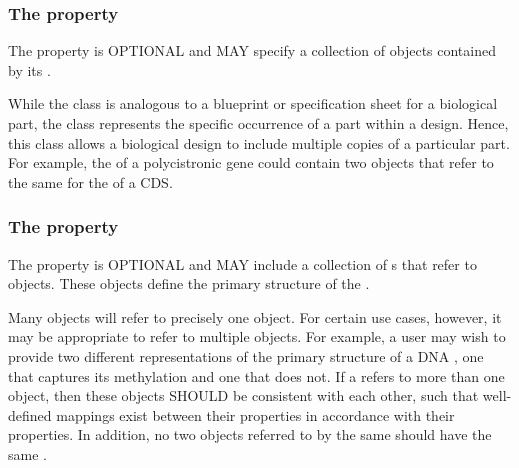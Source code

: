 \subsubsection*{The  property}
\label{sec:components}

The  property is OPTIONAL and MAY specify a collection of  objects contained by its .

While the  class is analogous to a blueprint or specification sheet for a biological part, the  class represents the specific occurrence of a part within a design. Hence, this class allows a biological design to include multiple copies of a particular part. For example, the  of a polycistronic gene could contain two  objects that refer to the same  for the  of a CDS.

\subsubsection*{The  property}
\label{sec:sequences}
The  property is OPTIONAL and MAY include a collection of s that refer to  objects. These objects define the primary structure of the .

Many  objects will refer to precisely one  object. For certain use cases, however, it may be appropriate to refer to multiple  objects. For example, a user may wish to provide two different representations of the primary structure of a DNA , one that captures its methylation and one that does not. If a  refers to more than one  object, then these objects SHOULD be consistent with each other, such that well-defined mappings exist between their  properties in accordance with their  properties. In addition, no two  objects referred to by the same  should have the same .


